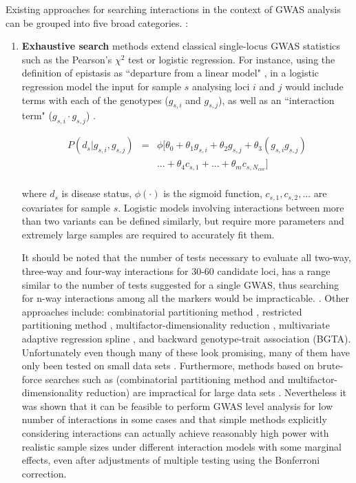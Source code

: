 Existing approaches for searching interactions in the context of GWAS analysis can be grouped into five broad categories. \cite{li2011detecting}:
\begin{enumerate}
	\item \textbf{Exhaustive search} methods extend classical single-locus GWAS statistics such as the Pearson's $\chi^2$ test or logistic regression.
For instance, using the definition of epistasis as ``departure from a linear model" \cite{cordell2009detecting}, in a logistic regression model the input for sample $s$ analysing loci $i$ and $j$ would include terms with each of the genotypes ($g_{s,i}$ and $g_{s,j}$), as well as an ``interaction term" ($g_{s,i} \cdot g_{s,j}$) \cite{cordell2002epistasis}. 

\begin{eqnarray*} \label{eq:gwasLogRegH1}
    P( d_s | g_{s,i},g_{s,j}) & = & \phi[ \theta_0 + \theta_1 g_{s,i} + \theta_2 g_{s,j} + \theta_3 (g_{s,i} g_{s,j}) \\
    & & ... + \theta_4 c_{s,1} + ... + \theta_m c_{s,N_{cov}} ] \\
\end{eqnarray*}

where $d_s$ is disease status, $\phi(\cdot)$ is the sigmoid function, $c_{s,1}, c_{s,2}, ... $ are covariates for sample $s$.
Logistic models involving interactions between more than two variants can be defined similarly, but require more parameters and extremely large samples are required to accurately fit them.

It should be noted that the number of tests necessary to evaluate all two-way, three-way and four-way interactions for 30-60 candidate loci, has a range similar to the number of tests suggested for a single GWAS, thus searching for n-way interactions among all the markers would be impracticable. \cite{culverhouse2002perspective}.
Other approaches include: combinatorial partitioning method \cite{nelson2001combinatorial}, restricted partitioning method \cite{culverhouse2004detecting}, multifactor-dimensionality reduction \cite{ritchie2001multifactor}, multivariate adaptive regression spline \cite{cook2004tree}, and backward genotype-trait association (BGTA)\cite{zheng2006backward}. 
Unfortunately even though many of these look promising, many of them have only been tested on small data sets \cite{zhang2007bayesian}.
Furthermore, methods based on brute-force searches such as (combinatorial partitioning method and multifactor-dimensionality reduction) are impractical for large data sets \cite{zhang2007bayesian}.
Nevertheless it was shown \cite{li2011detecting} that it can be feasible to perform GWAS level analysis for low number of interactions in some cases and that simple methods explicitly considering interactions can actually achieve reasonably high power with realistic sample sizes under different interaction models with some marginal effects, even after adjustments of multiple testing using the Bonferroni correction.
	

\end{enumerate}
